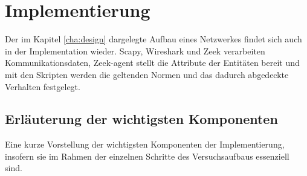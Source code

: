 \chapter{Implementierung}%
\label{cha:implementation}





Der im Kapitel \ref{cha:design} dargelegte Aufbau eines Netzwerkes findet sich auch in der Implementation wieder. Scapy, Wireshark und Zeek verarbeiten Kommunikationsdaten, Zeek-agent stellt die Attribute der Entitäten bereit und mit den Skripten werden die geltenden Normen und das dadurch abgedeckte Verhalten festgelegt.
\section{Erläuterung der wichtigsten Komponenten}
Eine kurze Vorstellung der wichtigsten Komponenten der Implementierung, insofern sie im Rahmen der einzelnen Schritte des Versuchsaufbaus essenziell sind.
